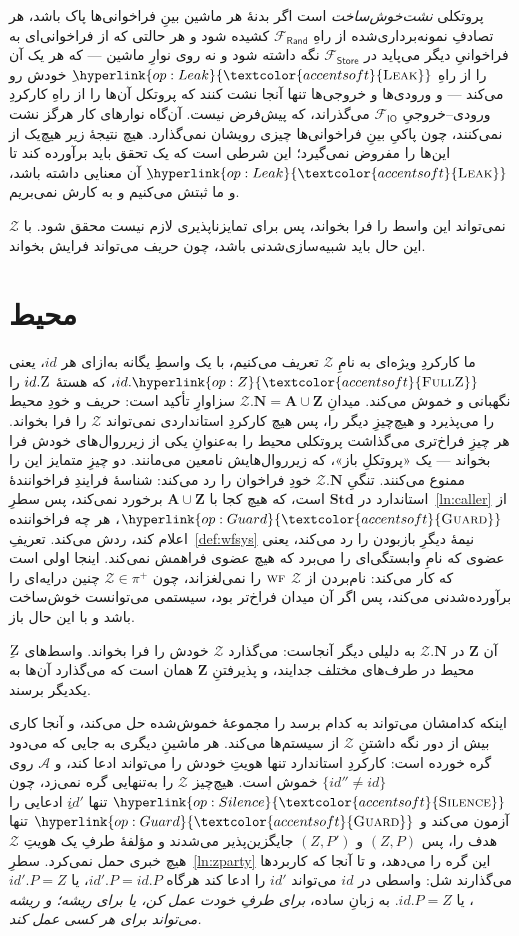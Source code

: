 \documentclass[10pt,oneside,openany]{book}
\newcommand{\admits}{\mathbf{N}}
\newcommand{\Apid}{\mathbf{A}}
\newcommand{\Zpid}{\mathbf{Z}}
\newcommand{\Stdpid}{\mathbf{Std}}
\newcommand{\WF}{\op{wf}}
\newcommand{\Zenv}{\mathcal{Z}}
\newcommand{\Adv}{\mathcal{A}}
\newcommand{\op}[1]{\textnormal{\textsc{#1}}}
\newcommand{\opl}[1]{\hyperlink{op:#1}{\textcolor{accentsoft}{\op{#1}}}}
\newcommand{\fopl}[1]{\hyperlink{op:#1}{\textcolor{accentsoft}{\op{Full}\op{#1}}}}
\newcommand{\id}{id}
\newcommand{\Frand}{\mathcal{F}_{\mathsf{Rand}}}
\newcommand{\Fstore}{\mathcal{F}_{\mathsf{Store}}}
\newcommand{\Fio}{\mathcal{F}_{\mathsf{IO}}}
\theoremstyle{accentdef}
\theoremstyle{accentplain}
\begin{document}
پروتکلی \emph{نشت‌خوش‌ساخت} است اگر بدنهٔ هر ماشین بینِ فراخوانی‌ها پاک
باشد، هر تصادفِ نمونه‌برداری‌شده از راهِ $\Frand$ کشیده شود و هر حالتی که
از فراخوانی‌ای به فراخوانیِ دیگر می‌پاید در $\Fstore$ نگه داشته شود و نه
روی نوارِ ماشین --- که هر یک آن را از راهِ $\opl{Leak}$ِ خودش رو می‌کند
--- و ورودی‌ها و خروجی‌ها تنها آنجا نشت کنند که پروتکل آن‌ها را از راهِ
کارکردِ ورودی--خروجیِ $\Fio$ می‌گذراند، که پیش‌فرض نیست. آن‌گاه نوارهای
کار هرگز نشت نمی‌کنند، چون پاکیِ بینِ فراخوانی‌ها چیزی رویشان نمی‌گذارد.
هیچ نتیجهٔ زیر هیچ‌یک از این‌ها را مفروض نمی‌گیرد؛ این شرطی است که یک تحقق
باید برآورده کند تا $\opl{Leak}$ِ آن معنایی داشته باشد، و ما ثبتش می‌کنیم
و به کارش نمی‌بریم.

$\Zenv$ نمی‌تواند این واسط را فرا بخواند، پس برای تمایزناپذیری لازم نیست
محقق شود. با این حال باید شبیه‌سازی‌شدنی باشد، چون حریف می‌تواند فرایش
بخواند.

\section{محیط}\label{sec:env}

ما کارکردِ ویژه‌ای به نامِ $\Zenv$ تعریف می‌کنیم، با یک واسطِ یگانه به‌ازای
هر $\id$، یعنی $\id.\fopl{Z}$، که هستهٔ $\id.\op{Z}$ را نگهبانی و خموش
می‌کند. میدانِ $\Zenv.\admits = \Apid \cup \Zpid$ سزاوارِ تأکید است: حریف
و خودِ محیط را می‌پذیرد و هیچ‌چیزِ دیگر را، پس هیچ کارکردِ استانداردی
نمی‌تواند $\Zenv$ را فرا بخواند. هر چیزِ فراخ‌تری می‌گذاشت پروتکلی محیط را
به‌عنوانِ یکی از زیرروال‌های خودش فرا بخواند --- یک «پروتکلِ باز»، که
زیرروال‌هایش نامعین می‌مانند. دو چیزِ متمایز این را ممنوع می‌کنند. تنگیِ
$\Zenv.\admits$ خودِ فراخوان را رد می‌کند: شناسهٔ فرایندِ فراخوانندهٔ
استاندارد در $\Stdpid$ است، که هیچ کجا با $\Apid \cup \Zpid$ برخورد
نمی‌کند، پس سطرِ~\ref{ln:caller} از $\opl{Guard}$، هر چه فراخواننده اعلام
کند، ردش می‌کند. تعریفِ~\ref{def:wfsys} نیمهٔ دیگرِ بازبودن را رد می‌کند،
یعنی عضوی که نامِ وابستگی‌ای را می‌برد که هیچ عضوی فراهمش نمی‌کند. اینجا
اولی است که کار می‌کند: نام‌بردن از $\Zenv$ $\WF$ را نمی‌لغزاند، چون
$\Zenv \in \pi^{+}$ چنین درایه‌ای را برآورده‌شدنی می‌کند، پس اگر آن میدان
فراخ‌تر بود، سیستمی می‌توانست خوش‌ساخت باشد و با این حال باز.

آن $\Zpid$ در $\Zenv.\admits$ به دلیلی دیگر آنجاست: می‌گذارد $\Zenv$
خودش را فرا بخواند. واسط‌های $\op{Z}$ِ محیط در طرف‌های مختلف جدایند، و
پذیرفتنِ $\Zpid$ همان است که می‌گذارد آن‌ها به یکدیگر برسند.

اینکه کدامشان می‌تواند به کدام برسد را مجموعهٔ خموش‌شده حل می‌کند، و آنجا
کاری بیش از دور نگه داشتنِ $\Zenv$ از سیستم‌ها می‌کند. هر ماشینِ دیگری به
جایی که می‌دود گره خورده است: کارکردِ استاندارد تنها هویتِ خودش را
می‌تواند ادعا کند، و $\Adv$ روی $\{\id'' \neq \id\}$ خموش است. هیچ‌چیز
$\Zenv$ را به‌تنهایی گره نمی‌زد، چون $\opl{Silence}$ تنها $\id'$ِ ادعایی
را آزمون می‌کند و $\opl{Guard}$ تنها هدف را، پس $(Z,P)$ و $(Z,P')$
جایگزین‌پذیر می‌شدند و مؤلفهٔ طرفِ یک هویتِ $\Zenv$ هیچ خبری حمل نمی‌کرد.
سطرِ~\ref{ln:zparty} این گره را می‌دهد، و تا آنجا که کاربردها می‌گذارند
شل: واسطی در $\id$ می‌تواند $\id'$ را ادعا کند هرگاه $\id'.P = \id.P$، یا
$\id'.P = Z$، یا $\id.P = Z$. به زبانِ ساده، \emph{برای طرفِ خودت عمل کن،
یا برای ریشه؛ و ریشه می‌تواند برای هر کسی عمل کند.}
\end{document}
